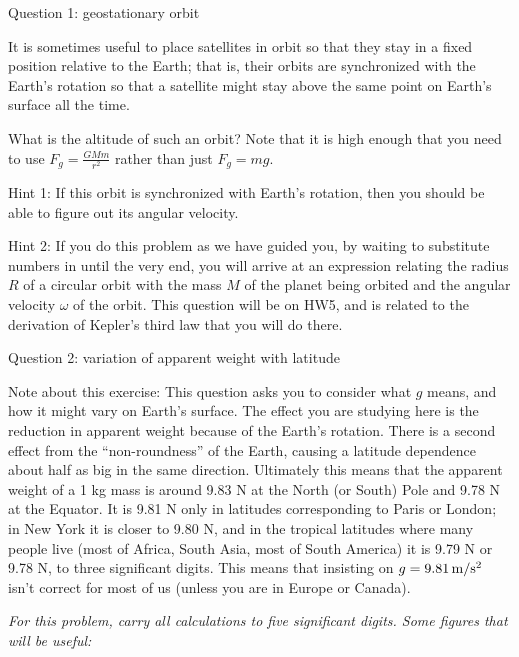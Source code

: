 \documentclass[12pt]{article}
\begin{document}
\Large
\centerline{}
\normalsize
\centerline{}

\medskip


\centerline{\Large Question 1: geostationary orbit}

It is sometimes useful to place satellites in orbit so that they stay in a fixed position relative to the
Earth; that is, their orbits are synchronized with the Earth's rotation so that a satellite might stay
above the same point on Earth’s surface all the time.

What is the altitude of such an orbit? Note that it is high enough that you need to use $F_g=\frac{GMm}{r^2}$
rather than just $F_g = mg$.

{\sc Hint 1:} If this orbit is synchronized with Earth's rotation, then you should be able to figure out its
angular velocity.

{\sc Hint 2:} If you do this problem as we have guided you, by waiting to substitute numbers in until the 
very end, you will arrive at an expression relating the radius $R$ of a circular orbit with the mass $M$ of the 
planet being orbited and the angular velocity $\omega$ of the orbit. This question will be on HW5, and is related
to the derivation of Kepler's third law that you will do there.

\newpage

\centerline{\Large Question 2: variation of apparent weight with latitude}

\medskip

{\small Note about this exercise: This question asks you to consider what $g$ means, and how it might vary on Earth's surface. The effect you are studying here is the reduction in apparent weight because of the Earth's rotation. There is a second effect from the ``non-roundness'' of the Earth, causing a latitude dependence about half as big in the same direction. Ultimately this means that the apparent weight of a 1 kg mass is around 9.83 N at the North (or South) Pole and 9.78 N at the Equator. It is 9.81 N only in latitudes corresponding to Paris or London; in New York it is closer to 9.80 N, and in the tropical latitudes where many people live (most of Africa, South Asia, most of South America) it is 9.79 N or 9.78 N, to three significant digits. This means that insisting on $g=9.81\,\rm m/\rm s^2$ isn't correct for most of us (unless you are in Europe or Canada).
}


\it For this problem, carry all calculations to five significant digits. Some figures that will be useful:
\end{document}
